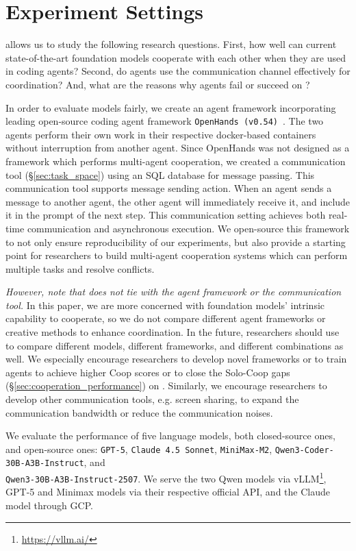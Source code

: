 
\section{Experiment Settings}\label{sec:experimental_design}


\dataset allows us to study the following research questions. First, how well can current state-of-the-art foundation models cooperate with each other when they are used in coding agents? Second, do agents use the communication channel effectively for coordination? And, what are the reasons why agents fail or succeed on \dataset? 

In order to evaluate models fairly, we create an agent framework incorporating leading open-source coding agent framework \texttt{OpenHands (v0.54)}~\citep{wang2024openhands}. The two agents perform their own work in their respective docker-based containers without interruption from another agent. Since OpenHands was not designed as a framework which performs multi-agent cooperation, we created a communication tool (\S\ref{sec:task_space}) using an SQL database for message passing. This communication tool supports message sending action. When an agent sends a message to another agent, the other agent will immediately receive it, and include it in the prompt of the next step. This communication setting achieves both real-time communication and asynchronous execution. We open-source this framework to not only ensure reproducibility of our experiments, but also provide a starting point for researchers to build multi-agent cooperation systems which can perform multiple tasks and resolve conflicts. 

\emph{However, note that \dataset does not tie with the agent framework or the communication tool.} In this paper, we are more concerned with foundation models' intrinsic capability to cooperate, so we do not compare different agent frameworks or creative methods to enhance coordination. In the future, researchers should use \dataset to compare different models, different frameworks, and different combinations as well. We especially encourage researchers to develop novel frameworks or to train agents to achieve higher Coop scores or to close the Solo-Coop gaps (\S\ref{sec:cooperation_performance}) on \dataset.
Similarly, we encourage researchers to develop other communication tools, e.g. screen sharing, to expand the communication bandwidth or reduce the communication noises. 

We evaluate the performance of five language models, both closed-source ones, and open-source ones: \texttt{GPT-5}, \texttt{Claude 4.5 Sonnet}, \texttt{MiniMax-M2}, \texttt{Qwen3-Coder-30B-A3B-Instruct}, and \\\texttt{Qwen3-30B-A3B-Instruct-2507}.
We serve the two Qwen models via vLLM\footnote{\url{https://vllm.ai/}}, GPT-5 and Minimax models via their respective official API, and the Claude model through GCP. 